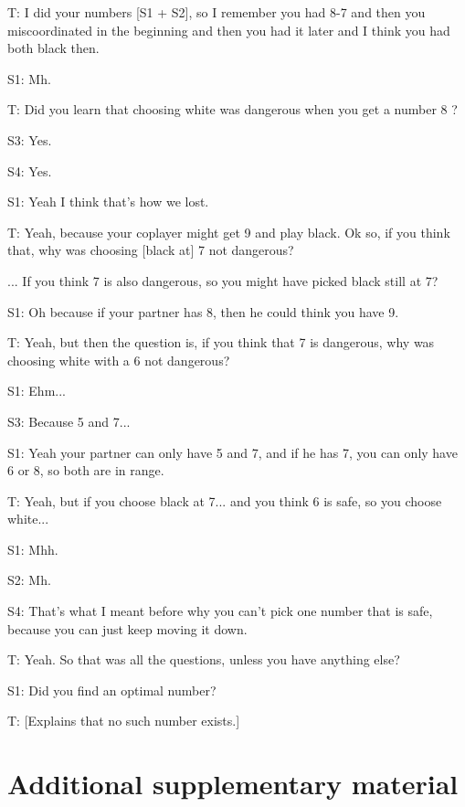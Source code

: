 T: I did your numbers [S1 + S2], so I remember you had 8-7 and then you miscoordinated in the beginning and then you had it later and I think you had both black then.

S1: Mh.

T: Did you learn that choosing white was dangerous when you get a number 8 ?

S3: Yes.

S4: Yes.

S1: Yeah I think that's how we lost.

T: Yeah, because your coplayer might get 9 and play black. Ok so, if you think that, why was choosing [black at] 7 not dangerous? 

... If you think 7 is also dangerous, so you might have picked black still at 7?

S1: Oh because if your partner has 8, then he could think you have 9.

T: Yeah, but then the question is, if you think that 7 is dangerous, why was choosing white with a 6 not dangerous?

S1: Ehm...

S3: Because 5 and 7...

S1: Yeah your partner can only have 5 and 7, and if he has 7, you can only have 6 or 8, so both are in range.

T: Yeah, but if you choose black at 7... and you think 6 is safe, so you choose white...

S1: Mhh.

S2: Mh.

S4: That's what I meant before why you can't pick one number that is safe, because you can just keep moving it down.

T: Yeah. So that was all the questions, unless you have anything else?

S1: Did you find an optimal number?

T: [Explains that no such number exists.]
 

\section{Additional supplementary material}


